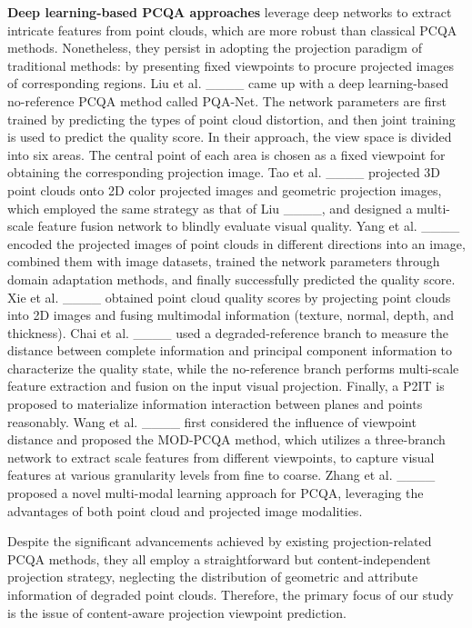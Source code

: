 \textbf{Deep learning-based PCQA approaches} leverage deep networks to extract intricate features from point clouds, which are more robust than classical PCQA methods.
Nonetheless, they persist in adopting the projection paradigm of traditional methods: by presenting fixed viewpoints to procure projected images of corresponding regions.
Liu et al. ____ came up with a deep learning-based no-reference PCQA method called PQA-Net. 
The network parameters are first trained by predicting the types of point cloud distortion, and then joint training is used to predict the quality score.
In their approach, the view space is divided into six areas. The central point of each area is chosen as a fixed viewpoint for obtaining the corresponding projection image.
Tao et al. ____ projected 3D point clouds onto 2D color projected images and geometric projection images, which employed the same strategy as that of Liu ____, and designed a multi-scale feature fusion network to blindly evaluate visual quality.
Yang et al. ____ encoded the projected images of point clouds in different directions into an image, combined them with image datasets, trained the network parameters through domain adaptation methods, and finally successfully predicted the quality score.
Xie et al. ____ obtained point cloud quality scores by projecting point clouds into 2D images and fusing multimodal information (texture, normal, depth, and thickness).
Chai et al. ____ used a degraded-reference branch to measure the distance between complete information and principal component information to characterize the quality state, while the no-reference branch performs multi-scale feature extraction and fusion on the input visual projection.
Finally, a P2IT is proposed to materialize information interaction between planes and points reasonably.
Wang et al. ____ first considered the influence of viewpoint distance and proposed the MOD-PCQA method, which utilizes a three-branch network to extract scale features from different viewpoints, to capture visual features at various granularity levels from fine to coarse.
Zhang et al. ____ proposed a novel multi-modal learning approach for PCQA, leveraging the advantages of both point cloud and projected image modalities.


Despite the significant advancements achieved by existing projection-related PCQA methods, they all employ a straightforward but content-independent projection strategy, neglecting the distribution of geometric and attribute information of degraded point clouds. 
Therefore, the primary focus of our study is the issue of content-aware projection viewpoint prediction. 

